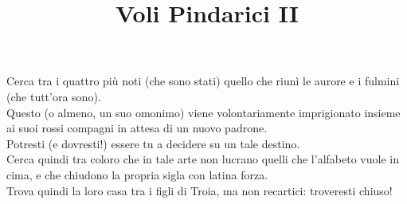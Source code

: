 \documentclass[12pt]{article}
\title{Voli Pindarici II}
\date{}
\begin{document}
\maketitle
\thispagestyle{empty}
\begin{center}
Cerca tra i quattro più noti (che sono stati) quello che riunì le aurore e i fulmini (che tutt'ora sono).\\
Questo (o almeno, un suo omonimo) viene volontariamente imprigionato insieme ai suoi rossi compagni in attesa di un nuovo padrone.\\
Potresti (e dovresti!) essere tu a decidere su un tale destino.\\
Cerca quindi tra coloro che in tale arte non lucrano quelli che l'alfabeto vuole in cima, e che chiudono la propria sigla con latina forza.\\
Trova quindi la loro casa tra i figli di Troia, ma non recartici: troveresti chiuso!\\

\end{center}
\end{document}
